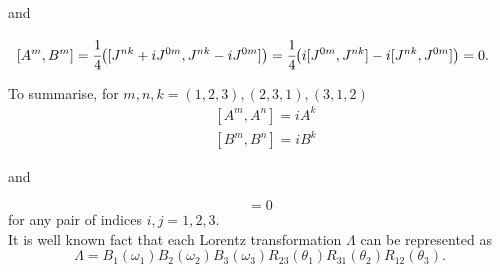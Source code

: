 \documentclass[main.tex]{subfiles}
\begin{document}
and

\begin{align*}
& [A^m, B^m] = \cfrac{1}{4}\big([J^{nk} + iJ^{0m}, J^{nk} - iJ^{0m}]\big) = 
\cfrac{1}{4}\big(i[J^{0m}, J^{nk}] - i[J^{nk}, J^{0m}]\big) = 0.
\end{align*}


To summarise,
for $m, n, k = (1, 2, 3), (2, 3, 1), (3, 1, 2)$
\begin{align*}
& [A^m, A^n] = iA^k \\
& [B^m, B^n] = iB^k
\end{align*} 

and

\begin{equation}
[A^i, B^j] = 0
\end{equation}
for any pair of indices $i, j = 1, 2, 3$.\\

It is well known fact that each Lorentz transformation $\Lambda$ can be represented as
\begin{equation}
\Lambda = B_1(\omega_1)B_2(\omega_2)B_3(\omega_3)R_{23}(\theta_1)R_{31}(\theta_2)R_{12}(\theta_3).
\end{equation}
\end{document}
